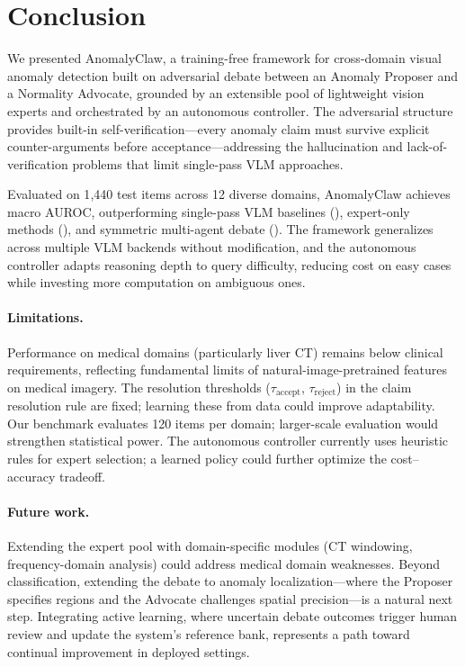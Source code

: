 \section{Conclusion}
\label{sec:conclusion}

We presented AnomalyClaw, a training-free framework for cross-domain visual anomaly detection built on adversarial debate between an Anomaly Proposer and a Normality Advocate, grounded by an extensible pool of lightweight vision experts and orchestrated by an autonomous controller.
The adversarial structure provides built-in self-verification---every anomaly claim must survive explicit counter-arguments before acceptance---addressing the hallucination and lack-of-verification problems that limit single-pass VLM approaches.

Evaluated on 1{,}440 test items across 12 diverse domains, AnomalyClaw achieves  macro AUROC, outperforming single-pass VLM baselines (), expert-only methods (), and symmetric multi-agent debate ().
The framework generalizes across multiple VLM backends without modification, and the autonomous controller adapts reasoning depth to query difficulty, reducing cost on easy cases while investing more computation on ambiguous ones.

\paragraph{Limitations.}
Performance on medical domains (particularly liver CT) remains below clinical requirements, reflecting fundamental limits of natural-image-pretrained features on medical imagery.
The resolution thresholds ($\tau_{\text{accept}}$, $\tau_{\text{reject}}$) in the claim resolution rule are fixed; learning these from data could improve adaptability.
Our benchmark evaluates 120 items per domain; larger-scale evaluation would strengthen statistical power.
The autonomous controller currently uses heuristic rules for expert selection; a learned policy could further optimize the cost--accuracy tradeoff.

\paragraph{Future work.}
Extending the expert pool with domain-specific modules (CT windowing, frequency-domain analysis) could address medical domain weaknesses.
Beyond classification, extending the debate to anomaly localization---where the Proposer specifies regions and the Advocate challenges spatial precision---is a natural next step.
Integrating active learning, where uncertain debate outcomes trigger human review and update the system's reference bank, represents a path toward continual improvement in deployed settings.
